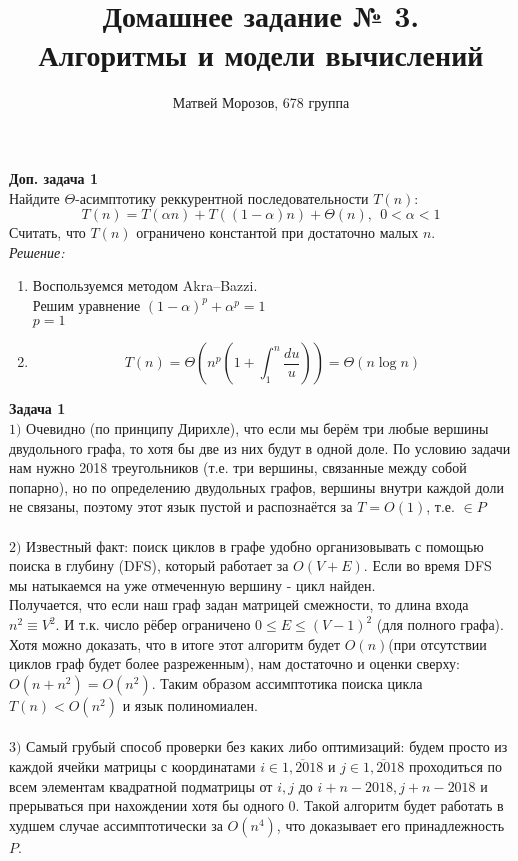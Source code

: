\documentclass[11pt]{article}
\begin{document}
	\author{Матвей Морозов, 678 группа}
	\title{Домашнее задание № 3.\\ Алгоритмы и модели вычислений}
	\maketitle
	
	\textbf{Доп. задача 1}
	\\
	Найдите $\Theta$-асимптотику реккурентной последовательности $T(n)$:
	\[T(n) = T(\alpha n) + T((1-\alpha)n) + \Theta(n),\ \  0<\alpha<1\]
	Считать, что $T(n)$ ограничено константой при достаточно малых $n$.
	\\
	
	{\itshape Решение:}
	
	\begin{enumerate}
		\item Воспользуемся методом Akra–Bazzi. \\
		
		Решим уравнение $(1-\alpha)^p + \alpha^p = 1$\\
		$p = 1$
		
		\item \[T(n) = \Theta (n^p (1 + \int_{1}^{n} \frac{du}{u} )) = \Theta (n \log n) \]
	\end{enumerate}
	
	\textbf{Задача 1}
	\\
$1)$ Очевидно (по принципу Дирихле), что если мы берём три любые вершины двудольного графа, то хотя бы две из них будут в одной доле. По условию задачи нам нужно 2018 треугольников (т.е. три вершины, связанные между собой попарно), но по определению двудольных графов, вершины внутри каждой доли не связаны, поэтому этот язык пустой и распознаётся за $T=O(1)$, т.е. $\in P $
\\
\\
$2)$ Известный факт: поиск циклов в графе удобно организовывать с помощью поиска в глубину (DFS), который работает за  $O(V+E)$. Если во время DFS мы натыкаемся на уже отмеченную вершину - цикл найден. \\
Получается, что если наш граф задан матрицей смежности, то длина входа $n^2\equiv V^2$. И т.к. число рёбер ограничено $0\leq E\leq (V-1)^2 $ (для полного графа). Хотя можно доказать, что в итоге этот алгоритм будет $O(n)$(при отсутствии циклов граф будет более разреженным), нам достаточно и оценки сверху: $ O(n+ n^2)= O(n^2).$ Таким образом ассимптотика поиска цикла $T(n)<O(n^2) $ и язык полиномиален.
\\
\\
$3)$  Самый грубый способ проверки без каких либо оптимизаций: будем просто из каждой ячейки матрицы с координатами $i\in \overline{1,2018}$ и $j\in \overline{1,2018}$ проходиться по всем элементам квадратной подматрицы от $i,j $ до $i+n-2018, j+n-2018$ и прерываться при нахождении хотя бы одного 0. 
Такой алгоритм будет работать в худшем случае ассимптотически за $O(n^4)$, что доказывает его принадлежность $P$.
\\
\\
\end{document}
